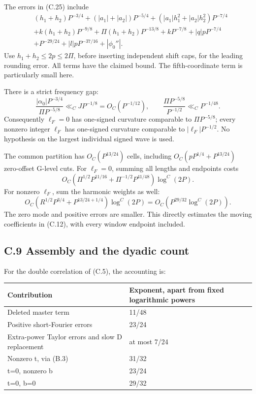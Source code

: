 \documentclass[11pt,a4paper]{article}
\begin{document}
The errors in (C.25) include \[
\begin{split}
&(h_1+h_2)P^{-3/4}
+( |a_1|+|a_2| )P^{-5/4}
+( |a_1|h_1^2+|a_2|h_2^2 )P^{-7/4}\\
&+k(h_1+h_2)P^{-9/8}
+\Pi(h_1+h_2)P^{-13/8}
+kP^{-7/8}+|q|pP^{-7/4}\\
&+P^{-29/24}+|l|pP^{-37/16}+|\phi_0''|.
\end{split}
\] Use \(h_1+h_2\le2p\le2\Pi\), before inserting independent shift caps,
for the leading rounding error. All terms have the claimed bound. The
fifth-coordinate term is particularly small here.

There is a strict frequency gap: \[
\frac{|\alpha_0|P^{-3/4}}{\Pi P^{-5/8}}
\ll_C JP^{-1/8}=O_C(P^{-1/12}),\qquad
\frac{\Pi P^{-5/8}}{P^{-1/2}}\ll_C P^{-1/48}. \tag{C.26}
\] Consequently \(\ell_F=0\) has one-signed curvature comparable to
\(\Pi P^{-5/8}\); every nonzero integer \(\ell_F\) has one-signed
curvature comparable to \(|\ell_F|P^{-1/2}\). No hypothesis on the
largest individual signed wave is used.

The common partition has \(O_C(P^{13/24})\) cells, including
\(O_C(pP^{1/4}+P^{13/24})\) zero-offset G-level cuts. For \(\ell_F=0\),
summing all lengths and endpoints costs \[
O_C\left(\Pi^{1/2}P^{11/16}
+\Pi^{-1/2}P^{41/48}\right)\log^C(2P).
\] For nonzero \(\ell_F\), sum the harmonic weights as well: \[
O_C\left(R^{1/2}P^{3/4}+P^{13/24+1/4}\right)\log^C(2P)
=O_C(P^{29/32}\log^C(2P)). \tag{C.27}
\] The zero mode and positive errors are smaller. This directly
estimates the moving coefficients in (C.12), with every window endpoint
included.

\subsection{C.9 Assembly and the dyadic
count}\label{c.9-assembly-and-the-dyadic-count}

For the double correlation of (C.5), the accounting is:

\begingroup\small

\begin{longtable}[]{@{}ll@{}}
\toprule\noalign{}
Contribution & Exponent, apart from fixed logarithmic powers \\
\midrule\noalign{}
\endhead
\bottomrule\noalign{}
\endlastfoot
Deleted master term & 11/48 \\
Positive short-Fourier errors & 23/24 \\
Extra-power Taylor errors and slow D replacement & at most 7/24 \\
Nonzero t, via (B.3) & 31/32 \\
t=0, nonzero b & 23/24 \\
t=0, b=0 & 29/32 \\
\end{longtable}
\end{document}
